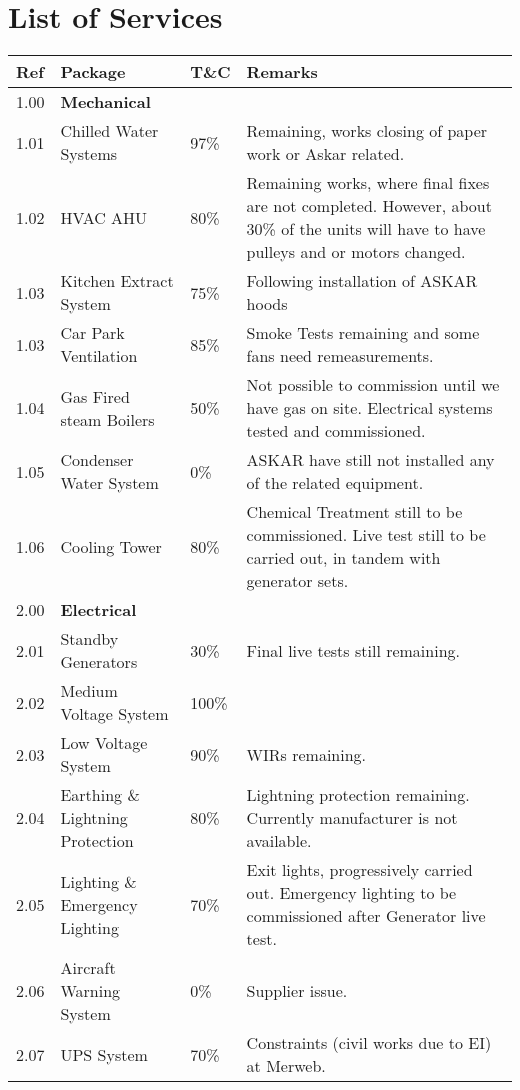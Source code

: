\section*{List of Services}
\label{masterplan}

\begin{longtable}{lllp{4.3cm}@{}}
\toprule
Ref	&Package	&T\&C	&Remarks\\
\midrule
1.00	&\textbf{Mechanical}	&	&\\
1.01	&Chilled Water Systems	&97\%	&Remaining, works closing of paper work or Askar related.\\
1.02	&HVAC AHU  & 80\%		&  Remaining works, where final fixes are not completed. However, about 30\% of the units will have to have pulleys and or motors changed.\\
1.03    &Kitchen Extract System &75\%& Following installation of ASKAR hoods\\
1.03	&Car Park Ventilation 	&85\%&Smoke Tests remaining and some fans need remeasurements.\\
1.04	&Gas Fired steam Boilers &50\%&Not possible to commission until we have gas on site. Electrical systems tested and commissioned.		\\
1.05	&Condenser Water System 	&0\%&ASKAR have still not installed any of the related equipment.     \\
1.06    &Cooling Tower &80\%&Chemical Treatment still to be commissioned. Live test still to be carried out, in tandem with generator sets. \\
\midrule
2.00	&\textbf{Electrical}		&&\\
2.01	&Standby Generators	&30\%& Final live tests still remaining. \\	
2.02	&Medium Voltage System	&100\%&\\	
2.03	&Low Voltage System		&90\%&WIRs remaining.\\
2.04	&Earthing \& Lightning Protection &80\%&Lightning protection remaining. Currently manufacturer is not available.\\		
2.05	&Lighting \& Emergency Lighting  &70\%& Exit lights, progressively carried out. Emergency lighting to be commissioned after Generator live test.\\		
2.06	&Aircraft Warning System &0\%& Supplier issue.\\		
2.07	&UPS System	&70\%& Constraints (civil works due to EI) at Merweb.\\	

\end{longtable}
